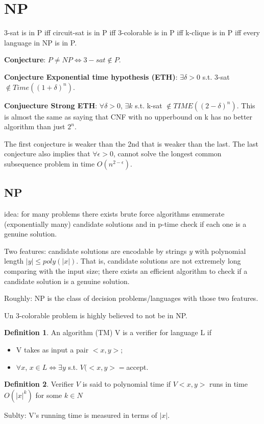 \documentclass{article}
\theoremstyle{plain}
\theoremstyle{definition}
\newtheorem{definition}{Definition}[section] %
\begin{document}
\section{NP}
3-sat is in P iff circuit-sat is in P iff 3-colorable is in P iff k-clique is in P iff every language in NP is in P. 

\textbf{Conjecture}: $P \neq NP \iff 3-sat \notin P$.

\textbf{Conjecture Exponential time hypothesis (ETH)}: $\exists \delta > 0$ s.t. 3-sat $\notin Time((1+\delta)^n)$.

\textbf{Conjuecture Strong ETH}: $\forall \delta > 0$, $\exists k$ s.t. k-sat $\notin TIME((2-\delta)^n)$. 
This is almost the same as saying that CNF with no upperbound on k has no better algorithm than just $2^n$. 

The first conjecture is weaker than the 2nd that is weaker than the last. The last conjecture also implies that $\forall \epsilon > 0$, cannot solve the longest common subsequence problem in time $O(n^{2-\epsilon})$.

\subsection{NP}
idea: for many problems there exists brute force algorithms enumerate (exponentially many) candidate solutions and in p-time check if each one is a genuine solution. 

Two features: candidate solutions are encodable by strings $y$ with polynomial length $|y| \le poly(|x|)$. That is, candidate solutions are not extremely long comparing with the input size; there exists an efficient algorithm to check if a candidate solution is a genuine solution. 

Roughly: NP is the class of decision problems/languages with those two features. 

Un 3-colorable problem is highly believed to not be in NP. 

\begin{definition}
An algorithm (TM) V is a verifier for language L if 
\begin{itemize}
    \item V takes as input a pair $<x,y>$;
    \item $\forall x$, $x \in L \iff \exists y$ s.t. $V(<x,y>=$accept.
\end{itemize}
\end{definition}

\begin{definition}
Verifier $V$ is said to polynomial time if $V<x,y>$ runs in time $O(|x|^k)$ for some $k \in N$
\end{definition}
Sublty: V's running time is measured in terms of $|x|$.
\end{document}
